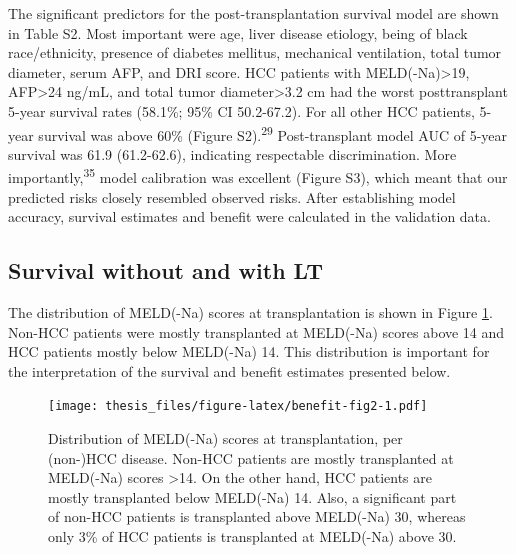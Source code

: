 \documentclass[11pt,english,]{book} %
\begin{document}
The significant predictors for the post-transplantation survival model are shown in Table S2. Most important were age, liver disease etiology, being of black race/ethnicity, presence of diabetes mellitus, mechanical ventilation, total tumor diameter, serum AFP, and DRI score. HCC patients with MELD(-Na)\textgreater19, AFP\textgreater24 ng/mL, and total tumor diameter\textgreater3.2 cm had the worst posttransplant 5-year survival rates (58.1\%; 95\% CI 50.2-67.2). For all other HCC patients, 5-year survival was above 60\% (Figure S2).\textsuperscript{29} Post-transplant model AUC of 5-year survival was 61.9 (61.2-62.6), indicating respectable discrimination. More importantly,\textsuperscript{35} model calibration was excellent (Figure S3), which meant that our predicted risks closely resembled observed risks. After establishing model accuracy, survival estimates and benefit were calculated in the validation data.

\hypertarget{survival-without-and-with-lt}{%
\subsection*{Survival without and with LT}\label{survival-without-and-with-lt}}

The distribution of MELD(-Na) scores at transplantation is shown in Figure \ref{fig:benefit-fig2}. Non-HCC patients were mostly transplanted at MELD(-Na) scores above 14 and HCC patients mostly below MELD(-Na) 14. This distribution is important for the interpretation of the survival and benefit estimates presented below.

\begin{figure}
\centering
\texttt{[image: thesis\_files/figure-latex/benefit-fig2-1.pdf]}
\caption{\label{fig:benefit-fig2}Distribution of MELD(-Na) scores at transplantation, per (non-)HCC disease. Non-HCC patients are mostly transplanted at MELD(-Na) scores \textgreater14. On the other hand, HCC patients are mostly transplanted below MELD(-Na) 14. Also, a significant part of non-HCC patients is transplanted above MELD(-Na) 30, whereas only 3\% of HCC patients is transplanted at MELD(-Na) above 30.}
\end{figure}
\end{document}
